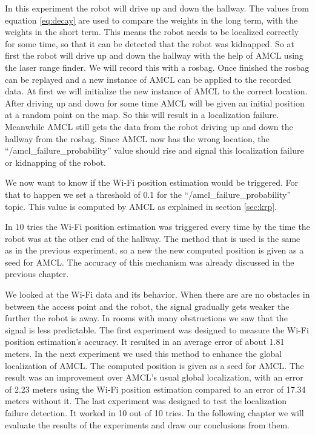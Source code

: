 In this experiment the robot will drive up and down the hallway. The values from equation \ref{eq:decay} are used to compare the weights in the long term, with the weights in the short term. This means the robot needs to be localized correctly for some time, so that it can be detected that the robot was kidnapped. So at first the robot will drive up and down the hallway with the help of AMCL using the laser range finder. We will record this with a rosbag. Once finished the rosbag can be replayed and a new instance of AMCL can be applied to the recorded data. At first we will initialize the new instance of AMCL to the correct location. After driving up and down for some time AMCL will be given an initial position at a random point on the map. So this will result in a localization failure. Meanwhile AMCL still gets the data from the robot driving up and down the hallway from the rosbag. Since AMCL now has the wrong location, the ``/amcl\_failure\_probability'' value should rise and signal this localization failure or kidnapping of the robot. 

We now want to know if the Wi-Fi position estimation would be triggered. For that to happen we set a threshold of 0.1 for the ``/amcl\_failure\_probability'' topic. This value is computed by AMCL as explained in section \ref{sec:krp}. 

In 10 tries the Wi-Fi position estimation was triggered every time by the time the robot was at the other end of the hallway. The method that is used is the same as in the previous experiment, so a new the new computed position is given as a seed for AMCL. The accuracy of this mechanism was already discussed in the previous chapter. 	

We looked at the Wi-Fi data and its behavior. When there are are no obstacles in between the access point and the robot, the signal gradually gets weaker the further the robot is away. In rooms with many obstructions we saw that the signal is less predictable. 
The first experiment was designed to measure the Wi-Fi position estimation's accuracy. It resulted in an average error of about 1.81 meters. In the next experiment we used this method to enhance the global localization of AMCL. The computed position is given as a seed for AMCL. The result was an improvement over AMCL's usual global localization, with an error of 2.23 meters using the Wi-Fi position estimation compared to an error of 17.34 meters without it.
The last experiment was designed to test the localization failure detection. It worked in 10 out of 10 tries. 
In the following chapter we will evaluate the results of the experiments and draw our conclusions from them.